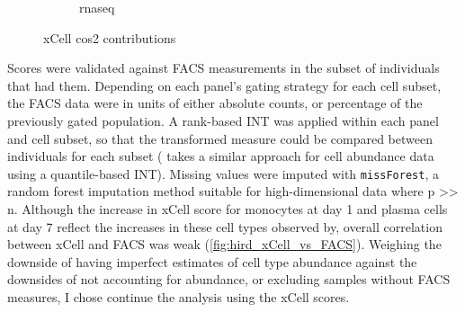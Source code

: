 \begin{figure}
\begin{subfigure}[b]{0.49\textwidth}
        \caption{rnaseq}
    \end{subfigure}%
    \caption{xCell cos2 contributions}
    \label{fig:hird_xCell_cos2}
\end{figure}

Scores were validated against \gls{FACS} measurements in the subset of individuals that had them.
Depending on each panel's gating strategy for each cell subset, the \gls{FACS} data were in units of either absolute counts, or percentage of the previously gated population.
A rank-based \gls{INT} was applied within each panel and cell subset, so that the transformed measure could be compared between individuals for each subset (\autocite{astle2016AllelicLandscapeHuman} takes a similar approach for cell abundance data using a quantile-based \gls{INT}).
%
Missing values were imputed with \texttt{missForest}, a random forest imputation method suitable for high-dimensional data where p >> n.
Although the increase in xCell score for monocytes at day 1 and plasma cells at day 7 reflect the increases in these cell types observed by\autocite{sobolev2016AdjuvantedInfluenzaH1N1Vaccination}, overall correlation between xCell and \gls{FACS} was weak (\autoref{fig:hird_xCell_vs_FACS}).
Weighing the downside of having imperfect estimates of cell type abundance against the downsides of not accounting for abundance, or excluding samples without \gls{FACS} measures, I chose continue the analysis using the xCell scores.

